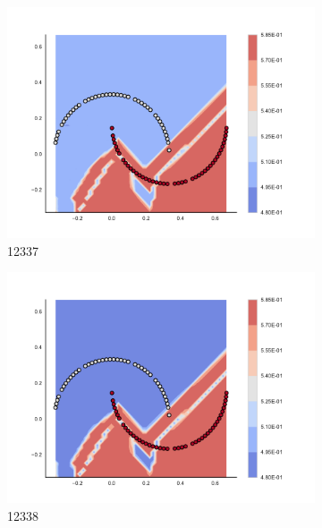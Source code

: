 \begin{figure}[h]
\begin{subfigure}[b]{0.09\textwidth}
    \includegraphics[clip, trim=2.35cm 1.75cm 4.5cm 0cm,width=\textwidth]{img/convergence/12337.pdf}
    \caption{12337}
    \label{fig:convergence_12337}
\end{subfigure}
%
\begin{subfigure}[b]{0.09\textwidth}
    \includegraphics[clip, trim=2.35cm 1.75cm 4.5cm 0cm,width=\textwidth]{img/convergence/12338.pdf}
    \caption{12338}
    \label{fig:convergence_12338}
\end{subfigure}
%
\begin{subfigure}[b]{0.09\textwidth}

\end{subfigure}
\end{figure}
